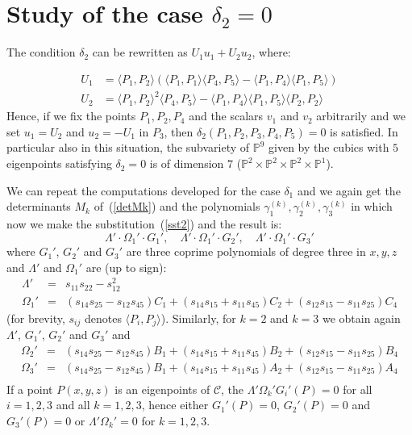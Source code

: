\documentclass{amsart}
\theoremstyle{plain}
\theoremstyle{definition}
\newcommand{\scl}[2]{\langle #1, #2 \rangle}
\begin{document}
\section{Study of the case  $\delta_2 =0$}

The condition $\delta_2$ can be rewritten as
$U_1u_1+U_2u_2$, where:

\begin{equation}
  \begin{split}
    U_1 & =  \langle P_1, P_2\rangle \left(\langle P_1, P_1\rangle
  \langle P_4,P_5\rangle - \langle P_1, P_4\rangle \langle P_1, P_5\rangle
  \right)\\
  U_2 & =  \langle P_1, P_2\rangle^2\langle P_4, P_5\rangle
  -\langle P_1, P_4\rangle \langle P_1, P_5\rangle \langle P_2, P_2\rangle
  \label{sst2}
  \end{split}
\end{equation}
Hence, if we fix the points $P_1, P_2, P_4$ and the scalars $v_1$ and $v_2$
arbitrarily and we set $u_1 = U_2$ and $u_2 = -U_1$ in $P_3$, then
$\delta_2(P_1, P_2, P_3, P_4, P_5) = 0$ is satisfied.
In particular also in this situation, the subvariety of $\mathbb{P}^9$
given by the cubics with $5$ eigenpoints satisfying $\delta_2=0$
is of dimension $7$
($\mathbb{P}^2 \times \mathbb{P}^2\times \mathbb{P}^2\times \mathbb{P}^1$).

We can repeat the computations developed for the case $\delta_1$
and we again get the determinants $M_k$ of~(\ref{detMk}) and the polynomials
$\gamma_1^{(k)}, \gamma_2^{(k)}, \gamma_3^{(k)}$ in which now we make the
substitution~(\ref{sst2}) and the result is:
\[
\Lambda'\cdot \Omega_1' \cdot G_1', \quad
\Lambda'\cdot \Omega_1' \cdot G_2', \quad
\Lambda'\cdot \Omega_1' \cdot G_3'
\]
where $G_1'$, $G_2'$ and $G_3'$ are three coprime polynomials of degree three
in $x, y, z$ and $\Lambda'$ and $\Omega_1'$ are (up to sign):
\begin{eqnarray}
  \Lambda' & = & s_{11}s_{22}-s_{12}^2\\
  \Omega_1' & = & (s_{14}s_{25} - s_{12}s_{45})C_1
  + (s_{14}s_{15} + s_{11}s_{45})C_2 + (s_{12}s_{15} - s_{11}s_{25})C_4
\end{eqnarray}
(for brevity,  $s_{ij}$ denotes $\scl{P_i}{P_j}$).
Similarly, for $k = 2$ and $k = 3$ we obtain again $\Lambda'$, $G_1'$,
$G_2'$ and $G_3'$ and
\begin{eqnarray*}
  \Omega_2' & = & (s_{14}s_{25} - s_{12}s_{45})B_1
  + (s_{14}s_{15} + s_{11}s_{45})B_2 + (s_{12}s_{15} - s_{11}s_{25})B_4\\
  \Omega_3' & = & (s_{14}s_{25} - s_{12}s_{45})B_1
  + (s_{14}s_{15} + s_{11}s_{45})A_2 + (s_{12}s_{15} - s_{11}s_{25})A_4\\
\end{eqnarray*}
If a point $P(x, y, z)$ is an eigenpoints of $\mathcal{C}$, the
$\Lambda'\Omega_k'G_i'(P)=0$ for all $i=1, 2, 3$ and all $k = 1, 2, 3$,
hence either $G_1'(P) = 0$, $G_2'(P) = 0$ and $G_3'(P)=0$ or
$\Lambda'\Omega_k' = 0$ for $k = 1, 2, 3$.
\end{document}
